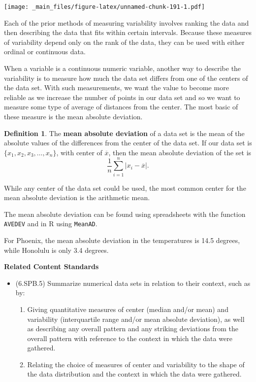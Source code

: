 \documentclass[
]{book}
\providecommand{\tightlist}{%
  \setlength{\itemsep}{0pt}\setlength{\parskip}{0pt}}
\newenvironment{standards}{}{}
\theoremstyle{definition}
\newtheorem{definition}{Definition}[chapter]
\theoremstyle{definition}
\theoremstyle{definition}
\theoremstyle{definition}
\theoremstyle{remark}
\begin{document}
\texttt{[image: \_main\_files/figure-latex/unnamed-chunk-191-1.pdf]}

Each of the prior methods of measuring variability involves ranking the data and then describing the data that fits within certain intervals. Because these measures of variability depend only on the rank of the data, they can be used with either ordinal or continuous data.

When a variable is a continuous numeric variable, another way to describe the variability is to measure how much the data set differs from one of the centers of the data set. With such measurements, we want the value to become more reliable as we increase the number of points in our data set and so we want to measure some type of average of distances from the center. The most basic of these measure is the mean absolute deviation.

\begin{definition}
The \textbf{mean absolute deviation} of a data set is the mean of the absolute values of the differences from the center of the data set. If our data set is \(\{x_1, x_2, x_3, \ldots, x_n\}\), with center of \(\overline{x}\), then the mean absolute deviation of the set is
\[\frac{1}{n} \sum_{i=1}^n |x_i-\overline{x}|.\]

While any center of the data set could be used, the most common center for the mean absolute deviation is the arithmetic mean.
\end{definition}

The mean absolute deviation can be found using spreadsheets with the function \texttt{AVEDEV} and in R using \texttt{MeanAD}.

For Phoenix, the mean absolute deviation in the temperatures is 14.5 degrees, while Honolulu is only 3.4 degrees.

\begin{standards}

\begin{center}
\textbf{Related Content Standards}

\end{center}

\begin{itemize}
\tightlist
\item
  (6.SPB.5) Summarize numerical data sets in relation to their context, such as by:

  \begin{enumerate}
  \def\labelenumi{\alph{enumi}.}
  \setcounter{enumi}{2}
  \tightlist
  \item
    Giving quantitative measures of center (median and/or mean) and variability (interquartile range and/or mean absolute deviation), as well as describing any overall pattern and any striking deviations from the overall pattern with reference to the context in which the data were gathered.
  \item
    Relating the choice of measures of center and variability to the shape of the data distribution and the context in which the data were gathered.
  \end{enumerate}
\end{itemize}

\end{standards}
\end{document}
